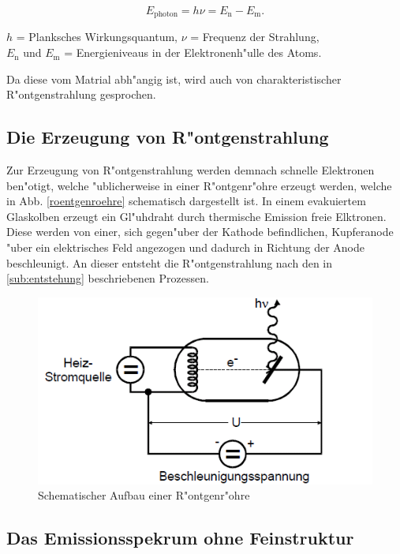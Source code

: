 		\begin{equation}
			E_{\text{photon}} = h \nu = E_\mathrm{n} - E_\mathrm{m}. \label{gleich_1}
		\end{equation}
		\begin{center}
			$h$ = Planksches Wirkungsquantum, $\nu$ = Frequenz der Strahlung,\\
			$E_\mathrm{n}$ und $E_\mathrm{m}$ = Energieniveaus in der Elektronenh"ulle des Atoms.
		\end{center}
	
		{Da diese vom Matrial abh"angig ist, wird auch von charakteristischer R"ontgenstrahlung gesprochen.}
		
	\subsection{Die Erzeugung von R"ontgenstrahlung}
	\label{sub:erzeugung}

		Zur Erzeugung von R"ontgenstrahlung werden demnach schnelle Elektronen ben"otigt, welche "ublicherweise in einer R"ontgenr"ohre erzeugt werden, welche in Abb. \eqref{roentgenroehre} schematisch dargestellt ist.
		In einem evakuiertem Glaskolben erzeugt ein Gl"uhdraht durch thermische Emission freie Elktronen. 
		Diese werden von einer, sich gegen"uber der Kathode be\-find\-lich\-en, Kupferanode "uber ein elektrisches Feld angezogen und dadurch in Richtung der Anode beschleunigt.
		An dieser entsteht die R"ontgenstrahlung nach den in \eqref{sub:entstehung} beschriebenen Prozessen.

		\begin{figure}[htbp]
			\centering
			\includegraphics[width = 12cm]{img/Roentgenroehre.png}
			\caption{Schematischer Aufbau einer R"ontgenr"ohre \cite{anleitung}}
			\label{roentgenroehre}
		\end{figure}

	\subsection{Das Emissionsspekrum ohne Feinstruktur}
	\label{sub:ohnefein}

